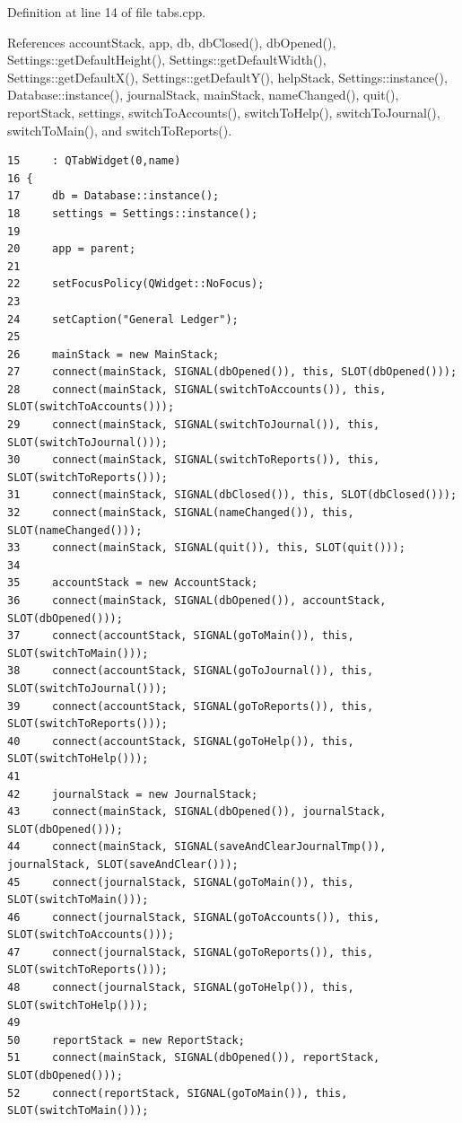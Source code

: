 Definition at line 14 of file tabs.cpp.

References account\-Stack, app, db, db\-Closed(), db\-Opened(), Settings::get\-Default\-Height(), Settings::get\-Default\-Width(), Settings::get\-Default\-X(), Settings::get\-Default\-Y(), help\-Stack, Settings::instance(), Database::instance(), journal\-Stack, main\-Stack, name\-Changed(), quit(), report\-Stack, settings, switch\-To\-Accounts(), switch\-To\-Help(), switch\-To\-Journal(), switch\-To\-Main(), and switch\-To\-Reports().

\footnotesize\begin{verbatim}15     : QTabWidget(0,name)
16 {
17     db = Database::instance();
18     settings = Settings::instance();
19 
20     app = parent;
21     
22     setFocusPolicy(QWidget::NoFocus);
23     
24     setCaption("General Ledger");
25     
26     mainStack = new MainStack;
27     connect(mainStack, SIGNAL(dbOpened()), this, SLOT(dbOpened()));
28     connect(mainStack, SIGNAL(switchToAccounts()), this, SLOT(switchToAccounts()));
29     connect(mainStack, SIGNAL(switchToJournal()), this, SLOT(switchToJournal()));
30     connect(mainStack, SIGNAL(switchToReports()), this, SLOT(switchToReports()));
31     connect(mainStack, SIGNAL(dbClosed()), this, SLOT(dbClosed()));
32     connect(mainStack, SIGNAL(nameChanged()), this, SLOT(nameChanged()));
33     connect(mainStack, SIGNAL(quit()), this, SLOT(quit()));
34     
35     accountStack = new AccountStack;
36     connect(mainStack, SIGNAL(dbOpened()), accountStack, SLOT(dbOpened()));
37     connect(accountStack, SIGNAL(goToMain()), this, SLOT(switchToMain()));
38     connect(accountStack, SIGNAL(goToJournal()), this, SLOT(switchToJournal()));
39     connect(accountStack, SIGNAL(goToReports()), this, SLOT(switchToReports()));
40     connect(accountStack, SIGNAL(goToHelp()), this, SLOT(switchToHelp()));
41     
42     journalStack = new JournalStack;
43     connect(mainStack, SIGNAL(dbOpened()), journalStack, SLOT(dbOpened()));
44     connect(mainStack, SIGNAL(saveAndClearJournalTmp()), journalStack, SLOT(saveAndClear()));
45     connect(journalStack, SIGNAL(goToMain()), this, SLOT(switchToMain()));
46     connect(journalStack, SIGNAL(goToAccounts()), this, SLOT(switchToAccounts()));
47     connect(journalStack, SIGNAL(goToReports()), this, SLOT(switchToReports()));
48     connect(journalStack, SIGNAL(goToHelp()), this, SLOT(switchToHelp()));
49     
50     reportStack = new ReportStack;
51     connect(mainStack, SIGNAL(dbOpened()), reportStack, SLOT(dbOpened()));
52     connect(reportStack, SIGNAL(goToMain()), this, SLOT(switchToMain()));

\end{verbatim}
